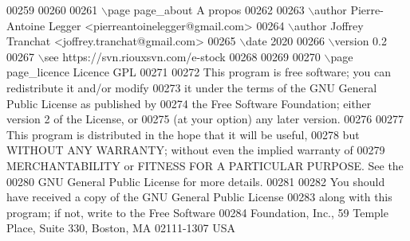 \begin{DoxyCode}
00259 
00260 
00261 \(\backslash\)page page\_about A propos
00262 
00263 \(\backslash\)author Pierre-Antoine Legger <pierreantoinelegger@gmail.com>
00264 \(\backslash\)author Joffrey Tranchat <joffrey.tranchat@gmail.com>
00265 \(\backslash\)date 2020
00266 \(\backslash\)version 0.2
00267 \(\backslash\)see https://svn.riouxsvn.com/e-stock
00268 
00269 
00270 \(\backslash\)page page\_licence Licence GPL
00271 
00272 This program is free software; you can redistribute it and/or modify
00273 it under the terms of the GNU General Public License as published by
00274 the Free Software Foundation; either version 2 of the License, or
00275 (at your option) any later version.
00276 
00277 This program is distributed in the hope that it will be useful,
00278 but WITHOUT ANY WARRANTY; without even the implied warranty of
00279 MERCHANTABILITY or FITNESS FOR A PARTICULAR PURPOSE. See the
00280 GNU General Public License for more details.
00281 
00282 You should have received a copy of the GNU General Public License
00283 along with this program; if not, write to the Free Software
00284 Foundation, Inc., 59 Temple Place, Suite 330, Boston, MA 02111-1307 USA
\end{DoxyCode}
